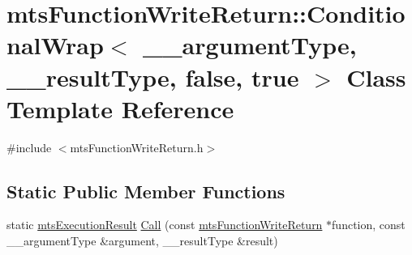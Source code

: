 \hypertarget{classmts_function_write_return_1_1_conditional_wrap_3_01____argument_type_00_01____result_type_00_01false_00_01true_01_4}{\section{mts\-Function\-Write\-Return\-:\-:Conditional\-Wrap$<$ \-\_\-\-\_\-argument\-Type, \-\_\-\-\_\-result\-Type, false, true $>$ Class Template Reference}
\label{classmts_function_write_return_1_1_conditional_wrap_3_01____argument_type_00_01____result_type_00_01false_00_01true_01_4}
}


{\ttfamily \#include $<$mts\-Function\-Write\-Return.\-h$>$}

\subsection*{Static Public Member Functions}
\begin{DoxyCompactItemize}
\item 
static \hyperlink{classmts_execution_result}{mts\-Execution\-Result} \hyperlink{classmts_function_write_return_1_1_conditional_wrap_3_01____argument_type_00_01____result_type_00_01false_00_01true_01_4_a764b0f30f553f16aac7f0c16c2022f9f}{Call} (const \hyperlink{classmts_function_write_return}{mts\-Function\-Write\-Return} $\ast$function, const \-\_\-\-\_\-argument\-Type \&argument, \-\_\-\-\_\-result\-Type \&result)
\end{DoxyCompactItemize}


